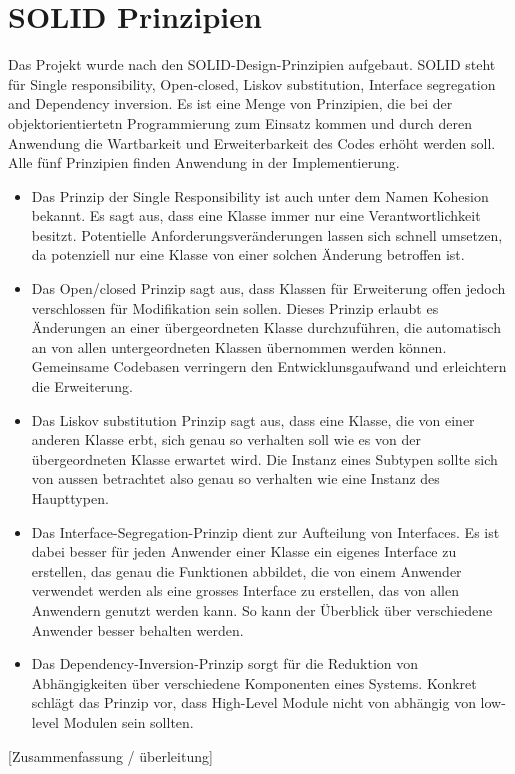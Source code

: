 \section{SOLID Prinzipien}

Das Projekt wurde nach den SOLID-Design-Prinzipien \cite{unclebob1995} aufgebaut. SOLID steht für Single responsibility, Open-closed, Liskov substitution, Interface segregation and Dependency inversion. Es ist eine Menge von Prinzipien, die bei der objektorientiertetn Programmierung zum Einsatz kommen und durch deren Anwendung die Wartbarkeit und Erweiterbarkeit des Codes erhöht werden soll. Alle fünf Prinzipien finden Anwendung in der Implementierung.

\begin{itemize}
\item Das Prinzip der Single Responsibility  ist auch unter dem Namen Kohesion bekannt. Es sagt aus, dass eine Klasse immer nur eine Verantwortlichkeit besitzt.  Potentielle Anforderungsveränderungen lassen sich schnell umsetzen, da potenziell nur eine Klasse von einer solchen Änderung betroffen ist.

\item Das Open/closed Prinzip sagt aus, dass Klassen für Erweiterung offen jedoch verschlossen für Modifikation sein sollen. Dieses Prinzip erlaubt es Änderungen an einer übergeordneten Klasse durchzuführen, die automatisch an von allen untergeordneten Klassen übernommen werden können. Gemeinsame Codebasen verringern den Entwicklunsgaufwand und erleichtern die Erweiterung.

\item Das Liskov substitution Prinzip sagt aus, dass eine Klasse, die von einer anderen Klasse erbt, sich genau so verhalten soll wie es von der übergeordneten Klasse erwartet wird. Die Instanz eines Subtypen sollte sich von aussen betrachtet also genau so verhalten wie eine Instanz des Haupttypen.

\item Das Interface-Segregation-Prinzip dient zur Aufteilung von Interfaces. Es ist dabei besser für jeden Anwender einer Klasse ein eigenes Interface zu erstellen, das genau die Funktionen abbildet, die von einem Anwender verwendet werden als eine grosses Interface zu erstellen, das von allen Anwendern genutzt werden kann. So kann der Überblick über verschiedene Anwender besser behalten werden.

\item Das Dependency-Inversion-Prinzip sorgt für die Reduktion von Abhängigkeiten über verschiedene Komponenten eines Systems. Konkret schlägt das Prinzip vor, dass High-Level Module nicht von abhängig von low-level Modulen sein sollten.

\end{itemize}

[Zusammenfassung / überleitung]
